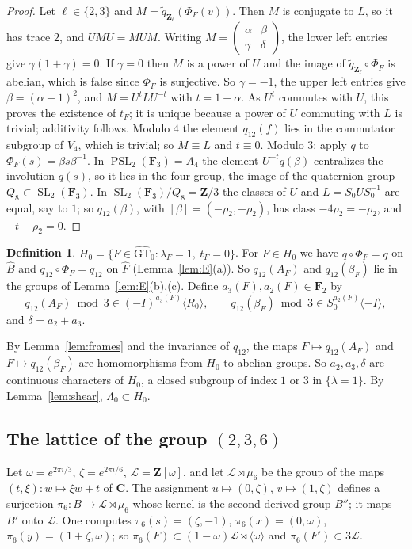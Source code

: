\documentclass[11pt,a4paper]{article}
\theoremstyle{plain}
\theoremstyle{definition}
\newtheorem{definition}[theorem]{Definition}
\theoremstyle{remark}
\newcommand{\GTz}{\widehat{\mathrm{GT}}_0}
\newcommand{\Z}{\mathbf Z}
\newcommand{\F}{\mathbf F}
\newcommand{\Fh}{\widehat F}
\newcommand{\Bh}{\widehat B}
\newcommand{\SL}{\operatorname{SL}}
\newcommand{\PSL}{\operatorname{PSL}}
\begin{document}
\begin{proof}
Let $\ell\in\{2,3\}$ and $M=\tilde q_{\Z_\ell}(\Phi_F(v))$. Then $M$ is conjugate to $L$, so it has trace $2$, and
$UMU=MUM$. Writing $M=\left(\begin{smallmatrix}\alpha&\beta\\\gamma&\delta\end{smallmatrix}\right)$, the lower left
entries give $\gamma(1+\gamma)=0$. If $\gamma=0$ then $M$ is a power of $U$ and the image of
$\tilde q_{\Z_\ell}\circ\Phi_F$ is abelian, which is false since $\Phi_F$ is surjective. So $\gamma=-1$, the upper
left entries give $\beta=(\alpha-1)^2$, and $M=U^tLU^{-t}$ with $t=1-\alpha$. As $U^t$ commutes with $U$, this
proves the existence of $t_F$; it is unique because a power of $U$ commuting with $L$ is trivial; additivity
follows. Modulo $4$ the element $q_{12}(f)$ lies in the commutator subgroup of $V_4$, which is trivial; so
$M\equiv L$ and $t\equiv0$. Modulo $3$: apply $q$ to $\Phi_F(s)=\beta s\beta^{-1}$. In $\PSL_2(\F_3)=A_4$ the
element $U^{-t}q(\beta)$ centralizes the involution $q(s)$, so it lies in the four-group, the image of the
quaternion group $Q_8\subset\SL_2(\F_3)$. In $\SL_2(\F_3)/Q_8=\Z/3$ the classes of $U$ and $L=S_0US_0^{-1}$ are
equal, say to $1$; so $q_{12}(\beta)$, with $[\beta]=(-\rho_2,-\rho_2)$, has class $-4\rho_2=-\rho_2$, and
$-t-\rho_2=0$.
\end{proof}

\begin{definition}\label{def:delta}
$H_0=\{F\in\GTz:\lambda_F=1,\ t_F=0\}$. For $F\in H_0$ we have $q\circ\Phi_F=q$ on $\Bh$ and
$q_{12}\circ\Phi_F=q_{12}$ on $\Fh$ (Lemma~\ref{lem:E}(a)). So $q_{12}(A_F)$ and $q_{12}(\beta_F)$ lie in the groups
of Lemma~\ref{lem:E}(b),(c). Define $a_3(F),a_2(F)\in\F_2$ by
\[
 q_{12}(A_F)\bmod3\in(-I)^{a_3(F)}\langle R_0\rangle,\qquad
 q_{12}(\beta_F)\bmod3\in S_0^{a_2(F)}\langle-I\rangle,
\]
and $\delta=a_2+a_3$.
\end{definition}

By Lemma~\ref{lem:frames} and the invariance of $q_{12}$, the maps $F\mapsto q_{12}(A_F)$ and
$F\mapsto q_{12}(\beta_F)$ are homomorphisms from $H_0$ to abelian groups. So $a_2,a_3,\delta$ are continuous
characters of $H_0$, a closed subgroup of index $1$ or $3$ in $\{\lambda=1\}$. By Lemma~\ref{lem:shear},
$\Lambda_0\subset H_0$.

\subsection*{The lattice of the group $(2,3,6)$}
Let $\omega=e^{2\pi i/3}$, $\zeta=e^{2\pi i/6}$, $\mathcal L=\Z[\omega]$, and let $\mathcal L\rtimes\mu_6$ be the
group of the maps $(t,\xi):w\mapsto\xi w+t$ of $\mathbf C$. The assignment $u\mapsto(0,\zeta)$, $v\mapsto(1,\zeta)$
defines a surjection $\pi_6:B\to\mathcal L\rtimes\mu_6$ whose kernel is the second derived group $B''$; it maps
$B'$ onto $\mathcal L$. One computes $\pi_6(s)=(\zeta,-1)$, $\pi_6(x)=(0,\omega)$, $\pi_6(y)=(1+\zeta,\omega)$; so
$\pi_6(F)\subset(1-\omega)\mathcal L\rtimes\langle\omega\rangle$ and $\pi_6(F')\subset3\mathcal L$.
\end{document}
